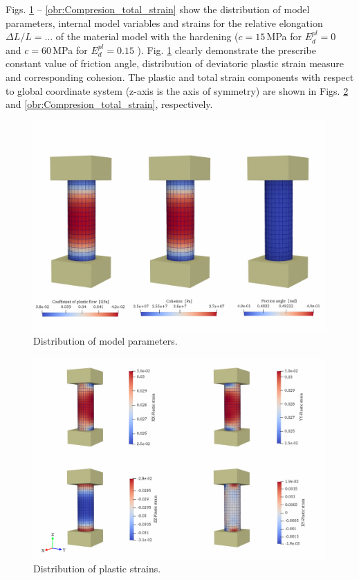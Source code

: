 Figs. \ref{obr:Compresion_parameters} – \ref{obr:Compresion_total_strain} show the distribution of model parameters, internal model variables and strains for the relative elongation $\Delta L/L = …$ of the material model with the hardening ($c=15$\,MPa for $E_d^{pl}=0$ and $c=60$\,MPa for $E_d^{pl}=0.15$ ). Fig. \ref{obr:Compresion_parameters} clearly demonstrate the prescribe constant value of friction angle, distribution of deviatoric plastic strain measure and corresponding cohesion. The plastic and total strain components with respect to global coordinate system (z-axis is the axis of symmetry) are shown in Figs. \ref{obr:Compresion_plastic_srain} and \ref{obr:Compresion_total_strain}, respectively. 


\begin{figure}[h!]
	\centering
	\includegraphics[width=1.05\textwidth]{obrazky/compression_parameters.jpg}
	\caption[Distribution of model parameters]{Distribution of model parameters.}\label{obr:Compresion_parameters}
\end{figure}


\begin{figure}[h!]
	\centering
	\includegraphics[width=1.05\textwidth]{obrazky/compression_zpevneni_pl_strain.png}
	\caption[Distribution of plastic strains]{Distribution of plastic strains.}\label{obr:Compresion_plastic_srain}
\end{figure}


